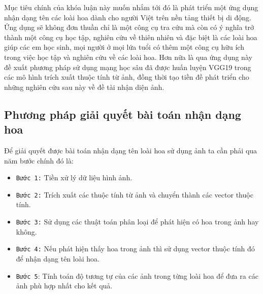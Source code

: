 \documentclass[12pt]{report}
\begin{document}
		Mục tiêu chính của khóa luận này muốn nhắm tới đó là phát triển một ứng dụng nhận dạng tên các loài hoa dành cho người Việt trên nền tảng thiết bị di động. Ứng dụng sẽ không đơn thuần chỉ là một công cụ tra cứu mà còn có ý nghĩa trở thành một công cụ học tập, nghiên cứu về thiên nhiên và đặc biệt là các loài hoa giúp các em học sinh, mọi người ở mọi lứa tuổi có thêm một công cụ hữu ích trong việc học tập và nghiên cứu về các loài hoa. Hơn nữa là qua ứng dụng này đề xuất phương pháp sử dụng mạng học sâu đã được huấn luyện VGG19 \cite{cia_vgg19} trong các mô hình trích xuất thuộc tính từ ảnh, đồng thời tạo tiền đề phát triển cho những nghiên cứu sau này về đề tài nhận diện ảnh.
																																																																						
		
																																																																						
		\subsection{Phương pháp giải quyết bài toán nhận dạng hoa}
																																																																				
		Để giải quyết được bài toán nhận dạng tên loài hoa sử dụng ảnh ta cần phải qua năm bước chính đó là:
																																																																				
		\begin{itemize}
			\item \texttt{Bước 1:} Tiền xử lý dữ liệu hình ảnh.
			\item \texttt{Bước 2:} Trích xuất các thuộc tính từ ảnh và chuyển thành các vector thuộc tính.
			\item \texttt{Bước 3:} Sử dụng các thuật toán phân loại để phát hiện có hoa trong ảnh hay không.
			\item \texttt{Bước 4:}	Nếu phát hiện thấy hoa trong ảnh thì sử dụng vector thuộc tính đó để nhận dạng tên loài hoa.
			\item \texttt{Bước 5}: Tính toán độ tương tự của các ảnh trong từng loài hoa để đưa ra các ảnh phù hợp nhất cho kết quả.
		\end{itemize}
																																																																		
																																																																		
\end{document}
